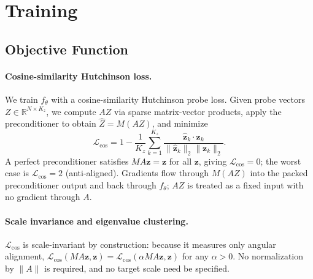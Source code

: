 \documentclass[acmtog,anonymous,review]{acmart}
\begin{document}
\section{Training}
\label{sec:training}

\subsection{Objective Function}
\label{sec:training:loss}

\paragraph{Cosine-similarity Hutchinson loss.}
We train $f_\theta$ with a cosine-similarity Hutchinson probe loss.  Given probe
vectors $Z \in \mathbb{R}^{N \times K_z}$, we compute $AZ$ via sparse matrix-vector products,
apply the preconditioner to obtain $\widehat{Z} = M(AZ)$, and minimize
\begin{equation}
  \mathcal{L}_{\mathrm{cos}} = 1 - \frac{1}{K_z} \sum_{k=1}^{K_z}
    \frac{\hat{\mathbf{z}}_k \cdot \mathbf{z}_k}
         {\|\hat{\mathbf{z}}_k\|_2 \|\mathbf{z}_k\|_2}.
  \label{eq:loss}
\end{equation}
A perfect preconditioner satisfies $MA\mathbf{z} = \mathbf{z}$ for all $\mathbf{z}$, giving
$\mathcal{L}_{\mathrm{cos}} = 0$; the worst case is $\mathcal{L}_{\mathrm{cos}} = 2$ (anti-aligned).
Gradients flow through $M(AZ)$ into the packed preconditioner output and back through
$f_\theta$; $AZ$ is treated as a fixed input with no gradient through $A$.

\paragraph{Scale invariance and eigenvalue clustering.}
$\mathcal{L}_{\mathrm{cos}}$ is scale-invariant by construction: because it measures only angular
alignment, $\mathcal{L}_{\mathrm{cos}}(MA\mathbf{z}, \mathbf{z}) =
\mathcal{L}_{\mathrm{cos}}(\alpha MA\mathbf{z}, \mathbf{z})$ for any $\alpha > 0$.  No
normalization by $\|A\|$ is required, and no target scale need be specified.
\end{document}
